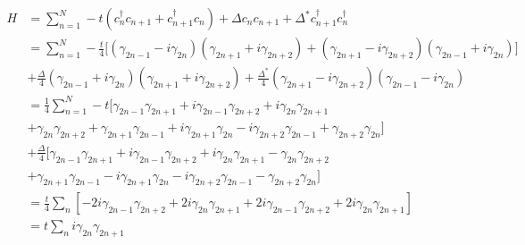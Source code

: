     \begin{equation}
        \begin{split}
            H&=\sum_{n=1}^N -t(c_n^\dagger c_{n+1}+c_{n+1}^\dagger c_n) + \Delta c_n c_{n+1}+\Delta^*c^\dagger_{n+1}c_n^\dagger\\
            &=\sum_{n=1}^N-\frac{t}{4}\Big[(\gamma_{2n-1}-i\gamma_{2n})(\gamma_{2n+1}+i\gamma_{2n+2})+(\gamma_{2n+1}-i\gamma_{2n+2})(\gamma_{2n-1}+i\gamma_{2n})\Big]\\
            &+\frac{\Delta}{4} (\gamma_{2n-1}+i\gamma_{2n})(\gamma_{2n+1}+i\gamma_{2n+2})+\frac{\Delta^*}{4}(\gamma_{2n+1}-i\gamma_{2n+2})(\gamma_{2n-1}-i\gamma_{2n})\\
            &=\frac{1}{4}\sum_{n=1}^N -t\Big[ \gamma_{2n-1}\gamma_{2n+1}+i\gamma_{2n-1}\gamma_{2n+2}+i\gamma_{2n}\gamma_{2n+1}\\    &+\gamma_{2n}\gamma_{2n+2}+\gamma_{2n+1}\gamma_{2n-1}+i\gamma_{2n+1}\gamma_{2n}-i\gamma_{2n+2}\gamma_{2n-1}+\gamma_{2n+2}\gamma_{2n} \Big]\\
            &+\frac{\Delta}{4}\Big[ \gamma_{2n-1}\gamma_{2n+1}+i\gamma_{2n-1}\gamma_{2n+2}+i\gamma_{2n}\gamma_{2n+1}-\gamma_{2n}\gamma_{2n+2}\\
            &+\gamma_{2n+1}\gamma_{2n-1}-i\gamma_{2n+1}\gamma_{2n}-i\gamma_{2n+2}\gamma_{2n-1}-\gamma_{2n+2}\gamma_{2n}\Big]\\
            &=\frac{t}{4}\sum_n[-2i\gamma_{2n-1}\gamma_{2n+2}+2i\gamma_{2n}\gamma_{2n+1}+2i\gamma_{2n-1}\gamma_{2n+2}+2i\gamma_{2n}\gamma_{2n+1}]\\
            &=t\sum_n i\gamma_{2n}\gamma_{2n+1}
        \end{split}
    \end{equation}
    \begin{center}
    \end{center}
